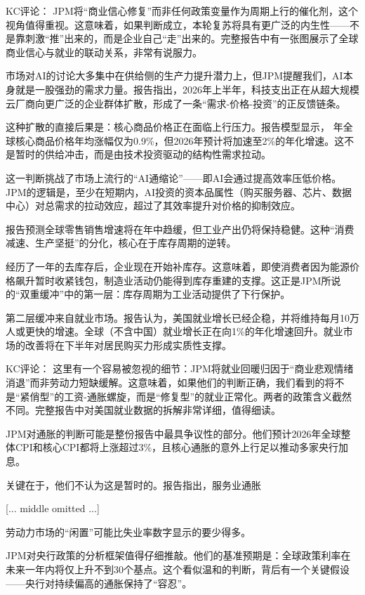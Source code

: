 \documentclass[11pt]{ctexart}
\begin{document}
KC评论： JPM将“商业信心修复”而非任何政策变量作为周期上行的催化剂，这个视角值得重视。这意味着，如果判断成立，本轮复苏将具有更广泛的内生性——不是靠刺激“推”出来的，而是企业自己“走”出来的。完整报告中有一张图展示了全球商业信心与就业的联动关系，非常有说服力。

市场对AI的讨论大多集中在供给侧的生产力提升潜力上，但JPM提醒我们，AI本身就是一股强劲的需求力量。报告指出，2026年上半年，科技支出正在从超大规模云厂商向更广泛的企业群体扩散，形成了一条“需求-价格-投资”的正反馈链条。

这种扩散的直接后果是：核心商品价格正在面临上行压力。报告模型显示， 年全球核心商品价格年均涨幅仅为0.9\%，但2026年预计将加速至2\%的年化增速。这不是暂时的供给冲击，而是由技术投资驱动的结构性需求拉动。

这一判断挑战了市场上流行的“AI通缩论”——即AI会通过提高效率压低价格。JPM的逻辑是，至少在短期内，AI投资的资本品属性（购买服务器、芯片、数据中心）对总需求的拉动效应，超过了其效率提升对价格的抑制效应。

报告预测全球零售销售增速将在年中趋缓，但工业产出仍将保持稳健。这种“消费减速、生产坚挺”的分化，核心在于库存周期的逆转。

经历了一年的去库存后，企业现在开始补库存。这意味着，即使消费者因为能源价格飙升暂时收紧钱包，制造业活动仍能得到库存重建的支撑。这正是JPM所说的“双重缓冲”中的第一层：库存周期为工业活动提供了下行保护。

第二层缓冲来自就业市场。报告认为，美国就业增长已经企稳，并将维持每月10万人或更快的增速。全球（不含中国）就业增长正在向1\%的年化增速回升。就业市场的改善将在下半年对居民购买力形成实质性支撑。

KC评论： 这里有一个容易被忽视的细节：JPM将就业回暖归因于“商业悲观情绪消退”而非劳动力短缺缓解。这意味着，如果他们的判断正确，我们看到的将不是“紧俏型”的工资-通胀螺旋，而是“修复型”的就业正常化。两者的政策含义截然不同。完整报告中对美国就业数据的拆解非常详细，值得细读。

JPM对通胀的判断可能是整份报告中最具争议性的部分。他们预计2026年全球整体CPI和核心CPI都将上涨超过3\%，且核心通胀的意外上行足以推动多家央行加息。

关键在于，他们不认为这是暂时的。报告指出，服务业通胀

[... middle omitted ...]

劳动力市场的“闲置”可能比失业率数字显示的要少得多。

JPM对央行政策的分析框架值得仔细推敲。他们的基准预期是：全球政策利率在未来一年内将仅上升不到30个基点。这个看似温和的判断，背后有一个关键假设——央行对持续偏高的通胀保持了“容忍”。
\end{document}
